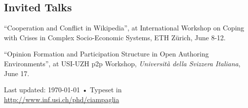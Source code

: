 \documentclass[10pt, a4paper]{article}
\newcommand{\years}[1]{\marginnote{\scriptsize #1}}
\begin{document}
\subsection*{Invited Talks}

\years{2009} ``Cooperation and Conflict in Wikipedia'', at International
Workshop on Coping with Crises in Complex Socio-Economic Systems, ETH Z\"urich,
June 8-12.

\years{2009} ``Opinion Formation and Participation Structure in Open Authoring
Environments'', at USI-UZH p2p Workshop, \textsl{Università della Svizzera
Italiana},
June 17.

\vfill{}

\begin{center}
{\scriptsize  Last updated: \today\- •\- 
Typeset in { \XeTeX}\\
\href{http://www.inf.usi.ch/phd/ciampaglia}{http://www.inf.usi.ch/phd/ciampaglia}}
\end{center}
\end{document}
